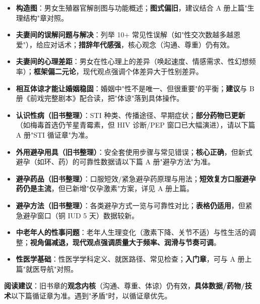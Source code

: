 \begin{itemize}
  \item \textbf{构造图}：男女生殖器官解剖图与功能概述；\textbf{图式偏旧}，建议结合 A 册上篇"生理结构"章对照。
  \item \textbf{夫妻间的误解问题与解决}：列举 10+ 常见性误解（如"性交次数越多越恩爱"），给应对话术；\textbf{措辞年代感强}，核心观念（沟通、尊重）仍有效。
  \item \textbf{夫妻间的心理差距}：男女在性心理上的差异（唤起速度、情感需求、性幻想频率）；\textbf{框架偏二元论}，现代观点强调个体差异大于性别差异。
  \item \textbf{相互体谅才能让婚姻稳固}：婚姻中"性不是唯一、但很重要"的平衡；\textbf{建议}与 B 册《前戏完整剧本》配合读，把"体谅"落到具体操作。
  \item \textbf{认识性病（旧书整理）}：STI 种类、传播途径、早期症状；\textbf{部分药物已更新}（如梅毒首选仍苄星青霉素，但 HIV 诊断/PEP 窗口已大幅演进），请以下篇 A 册"STI 循证章"为准。
  \item \textbf{外用避孕用具（旧书整理）}：安全套使用步骤与常见错误；\textbf{核心正确}，但新式避孕（如环、药）的可靠性数据请以下篇 A 册"避孕方法"为准。
  \item \textbf{避孕药品（旧书整理）}：口服短效/紧急避孕药原理与用法；\textbf{短效复方口服避孕药仍是主流}，但已新增"仅孕激素"方案，详见 A 册上篇。
  \item \textbf{避孕方法（旧书整理）}：各类避孕方式一览与可靠性对比；\textbf{表格仍适用}，但紧急避孕窗口（铜 IUD 5 天）数据较新。
  \item \textbf{中老年人的性事问题}：老年人生理变化（激素下降、关节不适）与性生活的调整；\textbf{视角偏减退，现代观点强调质量大于频率、润滑与节奏可调}。
  \item \textbf{性医学基础}：性医学学科定义、就医路径、常见检查；\textbf{入门章}，可与 A 册上篇"就医导航"对照。
\end{itemize}

\textbf{阅读建议}：旧书章的\textbf{观念内核}（沟通、尊重、体谅）仍有效，\textbf{具体数据/药物/技术}以下篇循证章为准。遇到"矛盾"时，以循证章优先。


